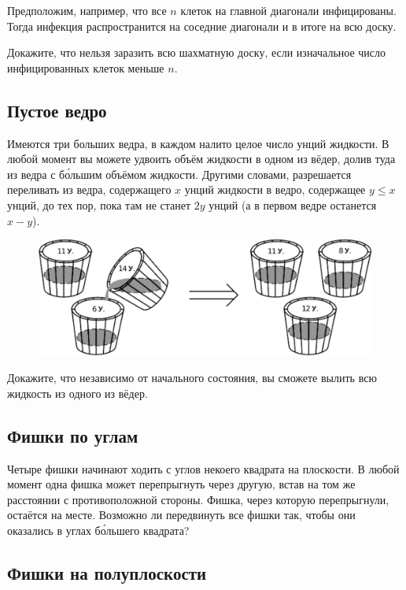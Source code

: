 Предположим, например, что все $n$ клеток на главной диагонали инфицированы.
Тогда инфекция распространится на соседние диагонали и в итоге на всю доску.

Докажите, что нельзя заразить всю шахматную доску, если изначальное число инфицированных клеток меньше $n$.

\subsection*{Пустое ведро}%

Имеются три больших ведра, в каждом налито целое число унций жидкости.
В любой момент вы можете удвоить объём жидкости в одном из вёдер, долив туда из ведра с б\'{о}льшим объёмом жидкости.
Другими словами, разрешается переливать из ведра, содержащего $x$ унций жидкости в ведро, содержащее 
$y\le x$ унций, до тех пор, пока там не станет $2y$ унций (а в первом ведре останется $x-y$).

\begin{figure}[h!]
\centering
\includegraphics[scale=0.6]{Figs/Algorithms/buckets-ru}
\end{figure}

Докажите, что независимо от начального состояния, вы сможете вылить всю жидкость из одного из вёдер.

\subsection*{Фишки по углам}%

Четыре фишки начинают ходить с углов некоего квадрата на плоскости.
В любой момент одна фишка может перепрыгнуть через другую,
встав на том же расстоянии с противоположной стороны.
Фишка, через которую перепрыгнули, остаётся на месте.
Возможно ли передвинуть все фишки так, чтобы они оказались в углах б\'{о}льшего квадрата?

\subsection*{Фишки на полуплоскости}%

